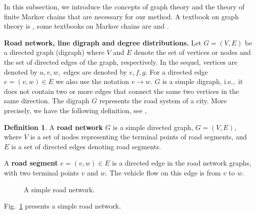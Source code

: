 \documentclass[b5paper,12pt]{report}
\theoremstyle{definition}
\newtheorem{definition}{Definition}
\begin{document}
In this subsection, we introduce the concepts of graph theory and the theory of finite Markov chains that are necessary for our method. A textbook on graph theory is \cite{JensenGutin2007}, some textbooks on Markov chains are \cite{Asmussen2003} and \cite{Bremaud1999}.

\smallskip

\textbf{Road network, line digraph and degree distributions.} Let $G = (V,E)$ be a directed graph (digraph) where $V$ and $E$ denote the set of vertices or nodes and the set of directed edges of the graph, respectively. In the sequel, vertices are denoted by $u, v, w,$ edges are denoted by $e, f, g$. For a directed edge $e = (v,w) \in E$ we also use the notation $v \rightarrow w$. $G$ is a simple digraph, i.e.,~it does not contain two or more edges that connect the same two vertices in the same direction. The digraph $G$ represents the road system of a city. More precisely, we have the following definition, see \cite{pan2013crowd}, 
\begin{definition}
A \textbf{road network} $G$ is a simple directed graph, $G = (V,E)$, where $V$ is a set of nodes representing the terminal points of road segments, and $E$ is a set of directed edges denoting road segments.

A \textbf{road segment} $e = (v,w) \in E$ is a directed edge in the road network graphs, with two terminal points $v$ and $w$. The vehicle flow on this edge is from $v$ to $w$.
\end{definition}

\begin{figure}[b!]
\centering
{}
\caption{A simple road network.}
\label{graph-example-1}
\end{figure}
Fig.~\ref{graph-example-1} presents a simple road network.
\end{document}
